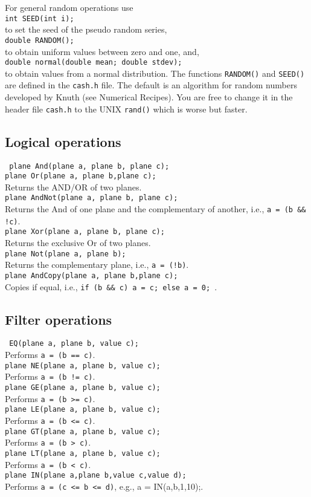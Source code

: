 \documentclass[12pt]{article}
\newcommand{\mtt}[1]{\texttt{\\#1\\}}
\begin{document}
For general random operations use
\mtt{ int SEED(int i);}
to set the seed of the pseudo random series,
\mtt{ double RANDOM();}
to obtain uniform values between zero and one, and,
\mtt{ double normal(double mean; double stdev);}
to obtain values from a normal distribution.
The functions {\tt RANDOM()} and {\tt SEED()} are defined
in the {\tt cash.h} file. The default is an algorithm
for random numbers developed by Knuth (see Numerical Recipes).
You are free to change it in the header file {\tt cash.h}
to the UNIX {\tt rand()} which is worse but faster.

\subsection{Logical operations}
\texttt{
plane And(plane a, plane b, plane c);\\
plane Or(plane a, plane b,plane c);\\
}
Returns the AND/OR of two planes.   
\mtt{ plane AndNot(plane a, plane b, plane c);}
Returns the And of one plane and the complementary of another,
i.e., {\tt a = (b \&\& !c)}.
\mtt{ plane Xor(plane a, plane b, plane c);}
Returns the exclusive Or of two planes.
\mtt{ plane Not(plane a, plane b);}
Returns the complementary plane, i.e., {\tt a = (!b)}.
\mtt{ plane AndCopy(plane a, plane b,plane c);}
Copies if equal, i.e., {\tt if (b \&\& c) a = c; else a = 0; }.


\subsection{Filter operations}
\texttt{ EQ(plane a, plane b, value c);\\}
Performs {\tt a = (b == c)}.
\mtt{ plane NE(plane a, plane b, value c);}
Performs {\tt a = (b != c)}.
\mtt{ plane GE(plane a, plane b, value c);}
Performs {\tt a = (b >= c)}.     
\mtt{ plane LE(plane a, plane b, value c);}
Performs {\tt a = (b <= c)}.      
\mtt{ plane GT(plane a, plane b, value c);}
Performs {\tt a = (b > c)}.    
\mtt{ plane LT(plane a, plane b, value c);}
Performs {\tt a = (b < c)}.   
\mtt{ plane IN(plane a,plane b,value c,value d);}
Performs {\tt a = (c <= b <= d)}, e.g., {a = IN(a,b,1,10);}. 
\end{document}
